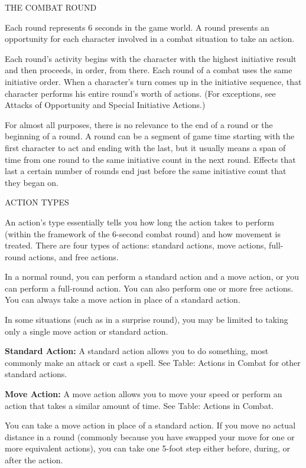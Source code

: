 \documentclass{article}
\begin{document}
\vspace{12pt}
THE COMBAT ROUND

Each round represents 6 seconds in the game world. A round presents an opportunity 
for each character involved in a combat situation to take an action. 

Each round's activity begins with the character with the highest initiative result 
and then proceeds, in order, from there. Each round of a combat uses the same initiative 
order. When a character's turn comes up in the initiative sequence, that character 
performs his entire round's worth of actions. (For exceptions, see Attacks of Opportunity 
and Special Initiative Actions.)

For almost all purposes, there is no relevance to the end of a round or the beginning 
of a round. A round can be a segment of game time starting with the first character 
to act and ending with the last, but it usually means a span of time from one round 
to the same initiative count in the next round. Effects that last a certain number 
of rounds end just before the same initiative count that they began on.

\vspace{12pt}
ACTION TYPES

An action's type essentially tells you how long the action takes to perform (within 
the framework of the 6-second combat round) and how movement is treated. There 
are four types of actions: standard actions, move actions, full-round actions, 
and free actions.

In a normal round, you can perform a standard action and a move action, or you 
can perform a full-round action. You can also perform one or more free actions. 
You can always take a move action in place of a standard action.

In some situations (such as in a surprise round), you may be limited to taking 
only a single move action or standard action.

\textbf{Standard Action:} A standard action allows you to do something, most commonly 
make an attack or cast a spell. See Table: Actions in Combat for other standard 
actions.

\textbf{Move Action:} A move action allows you to move your speed or perform an 
action that takes a similar amount of time. See Table: Actions in Combat.

You can take a move action in place of a standard action. If you move no actual 
distance in a round (commonly because you have swapped your move for one or more 
equivalent actions), you can take one 5-foot step either before, during, or after 
the action.
\end{document}
